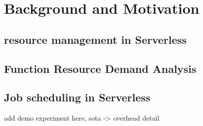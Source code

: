\section{Background and Motivation}
\label{sec:background}





\subsection{resource management in Serverless}




\subsection{Function Resource Demand Analysis}
\label{sec:demand-analysis}

\subsection{Job scheduling in Serverless}




add demo experiment here, sota -> overhead detail